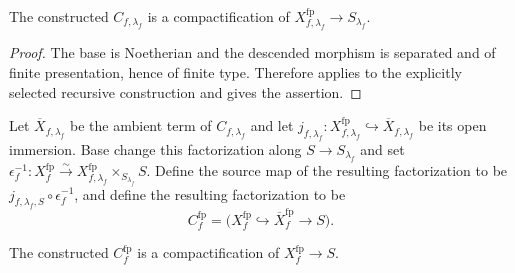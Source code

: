 \begin{lemma}
  \label{lemma:nagata-final-noetherian-compactification}

  The constructed $C_{f,\lambda_f}$ is a compactification of
  $X_{f,\lambda_f}^{\mathrm{fp}}\to S_{\lambda_f}$.
\end{lemma}

\begin{proof}
  The base is Noetherian and the descended morphism is separated and of
  finite presentation, hence of finite type.  Therefore
   applies to the
  explicitly selected recursive construction and gives the assertion.
\end{proof}

\begin{definition}

  \label{def:nagata-final-basechanged-compactification}

  Let $\overline X_{f,\lambda_f}$ be the ambient term of
  $C_{f,\lambda_f}$ and let
  $j_{f,\lambda_f}\colon X_{f,\lambda_f}^{\mathrm{fp}}
  \hookrightarrow\overline X_{f,\lambda_f}$ be its open immersion.  Base
  change this factorization along $S\to S_{\lambda_f}$ and set
  $\epsilon_f^{-1}\colon X_f^{\mathrm{fp}}\xrightarrow{\sim}
  X_{f,\lambda_f}^{\mathrm{fp}}\times_{S_{\lambda_f}}S$.  Define the source
  map of the resulting factorization to be
  $j_{f,\lambda_f,S}\circ\epsilon_f^{-1}$, and define the resulting
  factorization to be
  \[
    C_f^{\mathrm{fp}}
      =\bigl(X_f^{\mathrm{fp}}\hookrightarrow
        \overline X_f^{\mathrm{fp}}\longrightarrow S\bigr).
  \]
\end{definition}

\begin{lemma}
  \label{lemma:nagata-final-basechanged-compactification}

  The constructed $C_f^{\mathrm{fp}}$ is a compactification of
  $X_f^{\mathrm{fp}}\to S$.
\end{lemma}

